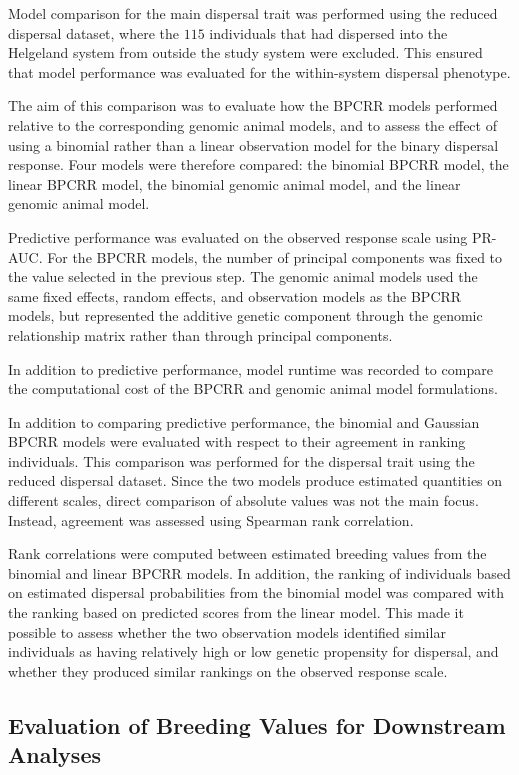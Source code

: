 Model comparison for the main dispersal trait was performed using the reduced dispersal dataset, where the $115$ individuals that had dispersed into the Helgeland system from outside the study system were excluded. This ensured that model performance was evaluated for the within-system dispersal phenotype.

The aim of this comparison was to evaluate how the BPCRR models performed relative to the corresponding genomic animal models, and to assess the effect of using a binomial rather than a linear observation model for the binary dispersal response. Four models were therefore compared: the binomial BPCRR model, the linear BPCRR model, the binomial genomic animal model, and the linear genomic animal model.

Predictive performance was evaluated on the observed response scale using PR-AUC. For the BPCRR models, the number of principal components was fixed to the value selected in the previous step. The genomic animal models used the same fixed effects, random effects, and observation models as the BPCRR models, but represented the additive genetic component through the genomic relationship matrix rather than through principal components.

In addition to predictive performance, model runtime was recorded to compare the computational cost of the BPCRR and genomic animal model formulations.


In addition to comparing predictive performance, the binomial and Gaussian BPCRR models were evaluated with respect to their agreement in ranking individuals. This comparison was performed for the dispersal trait using the reduced dispersal dataset. Since the two models produce estimated quantities on different scales, direct comparison of absolute values was not the main focus. Instead, agreement was assessed using Spearman rank correlation.

Rank correlations were computed between estimated breeding values from the binomial and linear BPCRR models. In addition, the ranking of individuals based on estimated dispersal probabilities from the binomial model was compared with the ranking based on predicted scores from the linear model. This made it possible to assess whether the two observation models identified similar individuals as having relatively high or low genetic propensity for dispersal, and whether they produced similar rankings on the observed response scale.

\subsection{Evaluation of Breeding Values for Downstream Analyses}

